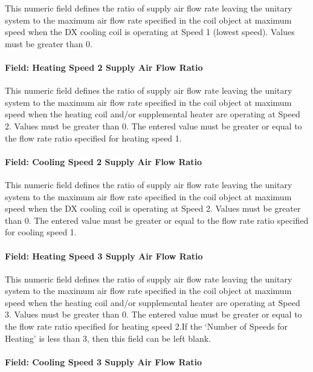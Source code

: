 This numeric field defines the ratio of supply air flow rate leaving the unitary system to the maximum air flow rate specified in the coil object at maximum speed when the DX cooling coil is operating at Speed 1 (lowest speed). Values must be greater than 0.

\paragraph{Field: Heating Speed 2 Supply Air Flow Ratio}\label{field-heating-speed-2-supply-air-flow-ratio}

This numeric field defines the ratio of supply air flow rate leaving the unitary system to the maximum air flow rate specified in the coil object at maximum speed when the heating coil and/or supplemental heater are operating at Speed 2. Values must be greater than 0. The entered value must be greater or equal to the flow rate ratio specified for heating speed 1.

\paragraph{Field: Cooling Speed 2 Supply Air Flow Ratio}\label{field-cooling-speed-2-supply-air-flow-ratio}

This numeric field defines the ratio of supply air flow rate leaving the unitary system to the maximum air flow rate specified in the coil object at maximum speed when the DX cooling coil is operating at Speed 2. Values must be greater than 0. The entered value must be greater or equal to the flow rate ratio specified for cooling speed 1.

\paragraph{Field: Heating Speed 3 Supply Air Flow Ratio}\label{field-heating-speed-3-supply-air-flow-ratio}

This numeric field defines the ratio of supply air flow rate leaving the unitary system to the maximum air flow rate specified in the coil object at maximum speed when the heating coil and/or supplemental heater are operating at Speed 3. Values must be greater than 0. The entered value must be greater or equal to the flow rate ratio specified for heating speed 2.If the `Number of Speeds for Heating' is less than 3, then this field can be left blank.

\paragraph{Field: Cooling Speed 3 Supply Air Flow Ratio}\label{field-cooling-speed-3-supply-air-flow-ratio}

